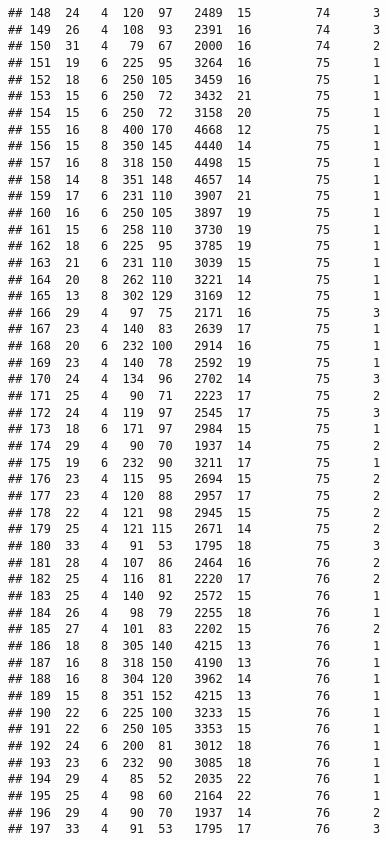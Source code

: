 \documentclass[]{article}
\begin{document}
\begin{verbatim}
## 148  24   4  120  97   2489  15         74      3
## 149  26   4  108  93   2391  16         74      3
## 150  31   4   79  67   2000  16         74      2
## 151  19   6  225  95   3264  16         75      1
## 152  18   6  250 105   3459  16         75      1
## 153  15   6  250  72   3432  21         75      1
## 154  15   6  250  72   3158  20         75      1
## 155  16   8  400 170   4668  12         75      1
## 156  15   8  350 145   4440  14         75      1
## 157  16   8  318 150   4498  15         75      1
## 158  14   8  351 148   4657  14         75      1
## 159  17   6  231 110   3907  21         75      1
## 160  16   6  250 105   3897  19         75      1
## 161  15   6  258 110   3730  19         75      1
## 162  18   6  225  95   3785  19         75      1
## 163  21   6  231 110   3039  15         75      1
## 164  20   8  262 110   3221  14         75      1
## 165  13   8  302 129   3169  12         75      1
## 166  29   4   97  75   2171  16         75      3
## 167  23   4  140  83   2639  17         75      1
## 168  20   6  232 100   2914  16         75      1
## 169  23   4  140  78   2592  19         75      1
## 170  24   4  134  96   2702  14         75      3
## 171  25   4   90  71   2223  17         75      2
## 172  24   4  119  97   2545  17         75      3
## 173  18   6  171  97   2984  15         75      1
## 174  29   4   90  70   1937  14         75      2
## 175  19   6  232  90   3211  17         75      1
## 176  23   4  115  95   2694  15         75      2
## 177  23   4  120  88   2957  17         75      2
## 178  22   4  121  98   2945  15         75      2
## 179  25   4  121 115   2671  14         75      2
## 180  33   4   91  53   1795  18         75      3
## 181  28   4  107  86   2464  16         76      2
## 182  25   4  116  81   2220  17         76      2
## 183  25   4  140  92   2572  15         76      1
## 184  26   4   98  79   2255  18         76      1
## 185  27   4  101  83   2202  15         76      2
## 186  18   8  305 140   4215  13         76      1
## 187  16   8  318 150   4190  13         76      1
## 188  16   8  304 120   3962  14         76      1
## 189  15   8  351 152   4215  13         76      1
## 190  22   6  225 100   3233  15         76      1
## 191  22   6  250 105   3353  15         76      1
## 192  24   6  200  81   3012  18         76      1
## 193  23   6  232  90   3085  18         76      1
## 194  29   4   85  52   2035  22         76      1
## 195  25   4   98  60   2164  22         76      1
## 196  29   4   90  70   1937  14         76      2
## 197  33   4   91  53   1795  17         76      3

\end{verbatim}
\end{document}
